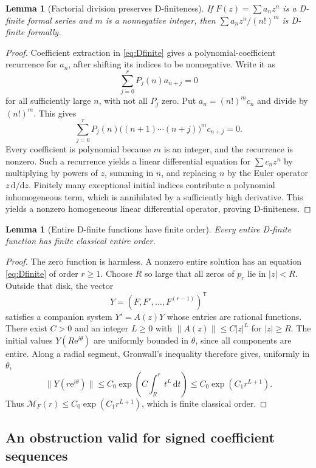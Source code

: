 \documentclass[11pt,a4paper]{article}
\numberwithin{equation}{section}
\newtheorem{lemma}[theorem]{Lemma}
\theoremstyle{definition}
\theoremstyle{remark}
\newcommand{\ee}{\mathrm e}
\newcommand{\dd}{\mathrm d}
\begin{document}
\begin{lemma}[Factorial division preserves D-finiteness]
\label{lem:factorialD}
If $F(z)=\sum a_nz^n$ is a D-finite formal series and $m$ is a
nonnegative integer, then $\sum a_nz^n/(n!)^m$ is D-finite formally.
\end{lemma}
\begin{proof}
Coefficient extraction in \eqref{eq:Dfinite} gives a polynomial-coefficient
recurrence for $a_n$, after shifting its indices to be nonnegative.
Write it as
\[
 \sum_{j=0}^rP_j(n)a_{n+j}=0
\]
for all sufficiently large $n$, with not all $P_j$ zero. Put
$a_n=(n!)^m c_n$ and divide by $(n!)^m$. This gives
\[
 \sum_{j=0}^r P_j(n)\bigl((n+1)\cdots(n+j)\bigr)^m c_{n+j}=0.
\]
Every coefficient is polynomial because $m$ is an integer, and the
recurrence is nonzero. Such a recurrence yields a linear differential
equation for $\sum c_nz^n$ by multiplying by powers of $z$, summing in
$n$, and replacing $n$ by the Euler operator $z\,\dd/\dd z$.
Finitely many exceptional initial indices contribute a polynomial
inhomogeneous term, which is annihilated by a sufficiently high
derivative. This yields a nonzero homogeneous linear differential
operator, proving D-finiteness.
\end{proof}

\begin{lemma}[Entire D-finite functions have finite order]
\label{lem:finiteorder}
Every entire D-finite function has finite classical entire order.
\end{lemma}
\begin{proof}
The zero function is harmless. A nonzero entire solution has an equation
\eqref{eq:Dfinite} of order $r\ge1$. Choose $R$ so large that all zeros
of $p_r$ lie in $|z|<R$. Outside that disk, the vector
\[
 Y=(F,F',\ldots,F^{(r-1)})^{\mathsf T}
\]
satisfies a companion system $Y'=A(z)Y$ whose entries are rational
functions. There exist $C>0$ and an integer $L\ge0$ with
$\|A(z)\|\le C|z|^L$ for $|z|\ge R$. The initial values
$Y(R\ee^{i\theta})$ are uniformly bounded in $\theta$, since all
components are entire. Along a radial segment, Gronwall's inequality
therefore gives, uniformly in $\theta$,
\[
 \|Y(r\ee^{i\theta})\|
 \le C_0\exp\left(C\int_R^r t^L\,\dd t\right)
 \le C_0\exp(C_1r^{L+1}).
\]
Thus $\mathcal M_F(r)\le C_0\exp(C_1r^{L+1})$, which is finite
classical order.
\end{proof}

\subsection{An obstruction valid for signed coefficient sequences}
\end{document}
